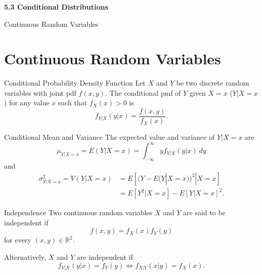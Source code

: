 \begin{frame}
  \frametitle{}
  
  \begin{center}
    \Large{\textbf{5.3 Conditional Distributions}}

    \bigskip

    \Large{Continuous Random Variables}
  \end{center}
  
\end{frame}

\section{Continuous Random Variables}

\begin{frame}

  \begin{block}{Conditional Probability Density Function}
    Let $X$ and $Y$ be two discrete random variables with joint pdf $f(x,y)$. The conditional pmf of $Y$ given $X=x$ ($Y|X=x$) for any value $x$ such that $f_X(x)>0$ is
    \[
      f_{Y|X}(y|x)=\frac{f(x,y)}{f_X(x)}.
    \]
  \end{block}
\end{frame}

\begin{frame}

  \begin{block}{Conditional Mean and Variance}
    The expected value and variance of $Y|X=x$ are
    \[
      \mu_{Y|X=x}=E(Y|X=x)=\int_{-\infty}^\infty y f_{Y|X}(y|x) ~dy
    \]
    and
    \begin{align*}
      \sigma^2_{Y|X=x}=V(Y|X=x)
                 &=E[(Y-E(Y|X=x))^2|X=x]\\
                 &=E[Y^2|X=x]-E[Y|X=x]^2.
    \end{align*}
  \end{block}
\end{frame}

\begin{frame}
  \begin{block}{Independence}
    Two continuous random variables $X$ and $Y$ are said to be independent if
    \[
      f(x,y)=f_X(x)f_Y(y)
    \]
    for every $(x,y)\in \mathbb R^2$. 
    
    \bigskip
    
    Alternatively, $X$ and $Y$ are independent if
    $$
    f_{Y|X}(y|x)=f_Y(y) \Leftrightarrow f_{X|Y}(x|y)=f_X(x).
    $$
  \end{block}
\end{frame}

